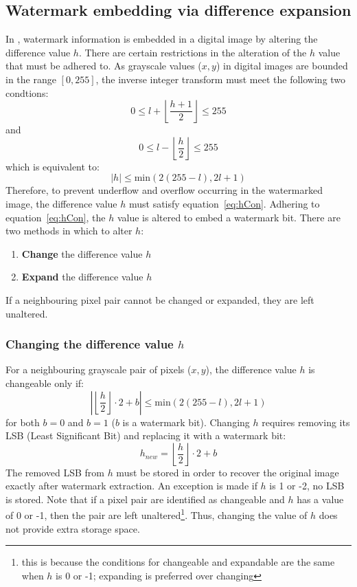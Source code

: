 \documentclass[10pt,twocolumn,letterpaper]{article}
\begin{document}
{\subsection{Watermark embedding via difference expansion}
In \cite{tian03}, watermark information is embedded in a digital image by altering the 
difference value $h$. There are certain restrictions in the alteration of the $h$ value
that must be adhered to.
As grayscale values ($x,y$) in digital images are bounded in the range $[0,255]$,
the inverse integer transform must meet the following two condtions:
\begin{equation}
0 \leq l + \left \lfloor \frac{h+1}{2} \right \rfloor \leq 255
\end{equation}
and
\begin{equation}
0 \leq l - \left \lfloor \frac{h}{2} \right \rfloor \leq 255
\end{equation}
which is equivalent to:
\begin{equation}
\label{eq:hCon}
|h| \leq \mbox{min} (2(255-l), 2l+1)
\end{equation}
Therefore, to prevent underflow and overflow occurring in the watermarked image, 
the difference value $h$ must satisfy equation~\ref{eq:hCon}. 
Adhering to equation~\ref{eq:hCon}, the $h$ value is altered to embed a 
watermark bit. There are two methods in which to alter $h$:
\begin{enumerate} 
	\item {\bf Change} the difference value $h$
	\item {\bf Expand} the difference value $h$
\end{enumerate} 
If a neighbouring pixel pair cannot be changed or expanded, they are left unaltered.

\subsubsection{Changing the difference value $h$}
\label{sec:change}
For a neighbouring grayscale pair of pixels ($x,y$), the difference value
$h$ is changeable only if:
\begin{equation}
\label{eq:chFind}
\left | \left \lfloor \frac{h}{2} \right \rfloor \cdot 2 + b \right | \leq \mbox{min}(2(255-l),2l+1)
\end{equation}
for both $b=0$ and $b=1$ ($b$ is a watermark bit).
Changing $h$ requires removing its LSB (Least Significant Bit) and replacing it with a watermark bit:
\begin{equation}
\label{eq:ch}
h_{new} = \left \lfloor \frac{h}{2} \right \rfloor \cdot 2 + b
\end{equation}
The removed LSB from $h$ must be stored in order to 
recover the original image exactly after watermark extraction. 
An exception is made if $h$ is 1 or -2, no LSB is stored.
Note that if a pixel pair are identified as changeable and $h$ has a value of 0
or -1, then the pair are left unaltered\footnote{this is because the conditions
for changeable and expandable are the same when $h$ is 0 or -1; expanding  
is preferred over changing}.
Thus, changing the value of $h$ does
not provide extra storage space.

}
\end{document}
